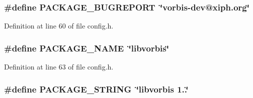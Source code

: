 \subsubsection[{\texorpdfstring{P\+A\+C\+K\+A\+G\+E\+\_\+\+B\+U\+G\+R\+E\+P\+O\+RT}{PACKAGE_BUGREPORT}}]{\setlength{\rightskip}{0pt plus 5cm}\#define P\+A\+C\+K\+A\+G\+E\+\_\+\+B\+U\+G\+R\+E\+P\+O\+RT~\char`\"{}vorbis-\/dev@xiph.\+org\char`\"{}}\hypertarget{mac_2config_2i386_2lib-src_2libvorbis_2config_8h_a1d1d2d7f8d2f95b376954d649ab03233}{}\label{mac_2config_2i386_2lib-src_2libvorbis_2config_8h_a1d1d2d7f8d2f95b376954d649ab03233}


Definition at line 60 of file config.\+h.

\subsubsection[{\texorpdfstring{P\+A\+C\+K\+A\+G\+E\+\_\+\+N\+A\+ME}{PACKAGE_NAME}}]{\setlength{\rightskip}{0pt plus 5cm}\#define P\+A\+C\+K\+A\+G\+E\+\_\+\+N\+A\+ME~\char`\"{}libvorbis\char`\"{}}\hypertarget{mac_2config_2i386_2lib-src_2libvorbis_2config_8h_a1c0439e4355794c09b64274849eb0279}{}\label{mac_2config_2i386_2lib-src_2libvorbis_2config_8h_a1c0439e4355794c09b64274849eb0279}


Definition at line 63 of file config.\+h.

\subsubsection[{\texorpdfstring{P\+A\+C\+K\+A\+G\+E\+\_\+\+S\+T\+R\+I\+NG}{PACKAGE_STRING}}]{\setlength{\rightskip}{0pt plus 5cm}\#define P\+A\+C\+K\+A\+G\+E\+\_\+\+S\+T\+R\+I\+NG~\char`\"{}libvorbis 1..\char`\"{}}\hypertarget{mac_2config_2i386_2lib-src_2libvorbis_2config_8h_ac73e6f903c16eca7710f92e36e1c6fbf}{}\label{mac_2config_2i386_2lib-src_2libvorbis_2config_8h_ac73e6f903c16eca7710f92e36e1c6fbf}


